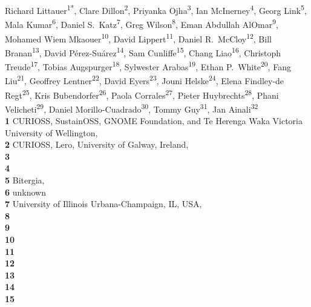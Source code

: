 Richard Littauer\textsuperscript{1*},
Clare Dillon\textsuperscript{2},
Priyanka Ojha\textsuperscript{3},
Ian McInerney\textsuperscript{4},
Georg Link\textsuperscript{5},
Mala Kumar\textsuperscript{6},
Daniel S.\ Katz\textsuperscript{7},
Greg Wilson\textsuperscript{8},
Eman Abdullah AlOmar\textsuperscript{9},
Mohamed Wiem Mkaouer\textsuperscript{10},
David Lippert\textsuperscript{11},
Daniel R.\ McCloy\textsuperscript{12},
Bill Branan\textsuperscript{13},
David Pérez-Suárez\textsuperscript{14},
Sam Cunliffe\textsuperscript{15},
Chang Liao\textsuperscript{16},
Christoph Treude\textsuperscript{17},
Tobias Augspurger\textsuperscript{18},
Sylwester Arabas\textsuperscript{19},
Ethan P.\ White\textsuperscript{20},
Fang Liu\textsuperscript{21},
Geoffrey Lentner\textsuperscript{22},
David Eyers\textsuperscript{23},
Jouni Helske\textsuperscript{24},
Elena Findley-de Regt\textsuperscript{25},
Kris Bubendorfer\textsuperscript{26},
Paola Corrales\textsuperscript{27},
Pieter Huybrechts\textsuperscript{28},
Phani Velicheti\textsuperscript{29},
Daniel Morillo-Cuadrado\textsuperscript{30},
Tommy Guy\textsuperscript{31},
Jan Ainali\textsuperscript{32}
\\
\bigskip
\textbf{1} CURIOSS, SustainOSS, GNOME Foundation, and Te Herenga Waka Victoria University of Wellington, \\
\textbf{2} CURIOSS, Lero, University of Galway, Ireland, \\
\textbf{3} \\
\textbf{4} \\
\textbf{5} Bitergia, \\
\textbf{6} unknown\\
\textbf{7} University of Illinois Urbana-Champaign, IL, USA, \\
\textbf{8} \\
\textbf{9} \\
\textbf{10} \\
\textbf{11} \\
\textbf{12} \\
\textbf{13} \\
\textbf{14} \\
\textbf{15} \\
